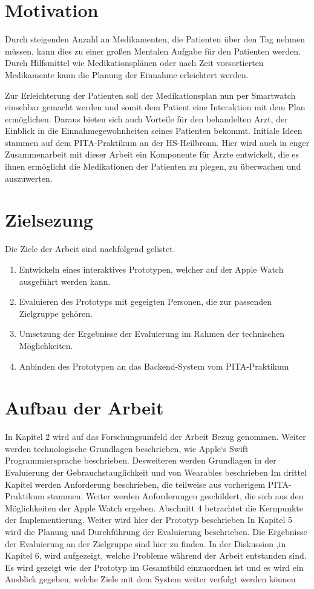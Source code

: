 \section{Motivation}
Durch steigenden Anzahl an Medikamenten, die Patienten über den Tag nehmen müssen, kann dies zu einer großen Mentalen Aufgabe für den Patienten werden. Durch Hilfsmittel wie Medikationsplänen oder nach Zeit vorsortierten Medikamente kann die Planung der Einnahme erleichtert werden. 

Zur Erleichterung der Patienten soll der Medikationsplan nun per Smartwatch einsehbar gemacht werden und somit dem Patient eine Interaktion mit dem Plan ermöglichen. Daraus bieten sich auch Vorteile für den behandelten Arzt, der Einblick in die Einnahmegewohnheiten seines Patienten bekommt. Initiale Ideen stammen auf dem PITA-Praktikum an der HS-Heilbronn. Hier wird auch in enger Zusammenarbeit mit dieser Arbeit ein Komponente für Ärzte entwickelt, die es ihnen ermöglicht die Medikationen der Patienten zu plegen, zu überwachen und auszuwerten.
\section{Zielsezung}
Die Ziele der Arbeit sind nachfolgend gelistet.

\begin{enumerate}
\item Entwickeln eines interaktives Prototypen, welcher auf der Apple Watch ausgeführt werden kann.
\item Evaluieren des Prototyps mit gegeigten Personen, die zur passenden Zielgruppe gehören.
\item Umsetzung der Ergebnisse der Evaluierung im Rahmen der technischen Möglichkeiten.
\item Anbinden des Prototypen an das Backend-System vom PITA-Praktikum
\end{enumerate}
\section{Aufbau der Arbeit}

In Kapitel 2 wird auf das Forschungsumfeld der Arbeit Bezug genommen. Weiter werden technologische Grundlagen beschrieben, wie Apple`s Swift Programmiersprache beschrieben. Desweiteren werden Grundlagen in der Evaluierung der Gebrauchstauglichkeit und von Wearables beschrieben
Im drittel Kapitel werden Anforderung beschrieben, die teilweise aus vorherigem PITA-Praktikum stammen. Weiter werden Anforderungen geschildert, die sich aus den Möglichkeiten der Apple Watch ergeben.
Abschnitt 4 betrachtet die Kernpunkte der Implementierung. Weiter wird hier der Prototyp beschrieben
In Kapitel 5 wird die Planung und Durchführung der Evaluierung beschrieben. Die  Ergebnisse der Evaluierung an der Zielgruppe sind hier zu finden.
In der Diskussion ,in Kapitel 6, wird aufgezeigt, welche Probleme während der Arbeit entstanden sind. Es wird gezeigt wie der Prototyp im Gesamtbild einzuordnen ist und es wird ein Ausblick gegeben, welche Ziele mit dem System weiter verfolgt werden können

